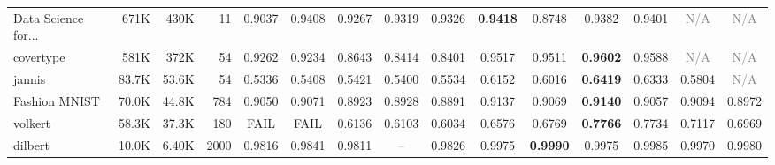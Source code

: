 \begin{table}[t]
{\begin{tabular}{lrrrccccccccccc}
Data Science for... & 671K & 430K & 11 & \cellcolor[HTML]{FDEDCC}0.9037 & \cellcolor[HTML]{DAEAD3}0.9408 & \cellcolor[HTML]{EAEED0}0.9267 & \cellcolor[HTML]{E4ECD1}0.9319 & \cellcolor[HTML]{E3ECD1}0.9326 & \cellcolor[HTML]{D9EAD3}\textbf{0.9418} & \cellcolor[HTML]{F4CCCC}0.8748 & \cellcolor[HTML]{DDEBD2}0.9382 & \cellcolor[HTML]{DBEAD3}0.9401 & \textcolor{gray}{N/A} & \textcolor{gray}{N/A} \\
covertype & 581K & 372K & 54 & \cellcolor[HTML]{EFEFCF}0.9262 & \cellcolor[HTML]{F0EFCF}0.9234 & \cellcolor[HTML]{F8DBCC}0.8643 & \cellcolor[HTML]{F4CDCC}0.8414 & \cellcolor[HTML]{F4CCCC}0.8401 & \cellcolor[HTML]{DEEBD2}0.9517 & \cellcolor[HTML]{DFEBD2}0.9511 & \cellcolor[HTML]{D9EAD3}\textbf{0.9602} & \cellcolor[HTML]{DAEAD3}0.9588 & \textcolor{gray}{N/A} & \textcolor{gray}{N/A} \\
jannis & 83.7K & 53.6K & 54 & \cellcolor[HTML]{F4CCCC}0.5336 & \cellcolor[HTML]{F5D1CC}0.5408 & \cellcolor[HTML]{F6D2CC}0.5421 & \cellcolor[HTML]{F5D0CC}0.5400 & \cellcolor[HTML]{F8DACC}0.5534 & \cellcolor[HTML]{ECEED0}0.6152 & \cellcolor[HTML]{F5F0CE}0.6016 & \cellcolor[HTML]{D9EAD3}\textbf{0.6419} & \cellcolor[HTML]{DFEBD2}0.6333 & \cellcolor[HTML]{FEEDCC}0.5804 & \textcolor{gray}{N/A} \\
Fashion MNIST & 70.0K & 44.8K & 784 & \cellcolor[HTML]{F4F0CE}0.9050 & \cellcolor[HTML]{EEEECF}0.9071 & \cellcolor[HTML]{F7D6CC}0.8923 & \cellcolor[HTML]{F7D7CC}0.8928 & \cellcolor[HTML]{F4CCCC}0.8891 & \cellcolor[HTML]{DAEAD3}0.9137 & \cellcolor[HTML]{EFEFCF}0.9069 & \cellcolor[HTML]{D9EAD3}\textbf{0.9140} & \cellcolor[HTML]{F2EFCE}0.9057 & \cellcolor[HTML]{E7EDD0}0.9094 & \cellcolor[HTML]{FBE5CC}0.8972 \\
volkert & 58.3K & 37.3K & 180 & \textcolor{red!70!black}{FAIL} & \textcolor{red!70!black}{FAIL} & \cellcolor[HTML]{F5D0CC}0.6136 & \cellcolor[HTML]{F5CFCC}0.6103 & \cellcolor[HTML]{F4CCCC}0.6034 & \cellcolor[HTML]{FBE4CC}0.6576 & \cellcolor[HTML]{FDECCC}0.6769 & \cellcolor[HTML]{D9EAD3}\textbf{0.7766} & \cellcolor[HTML]{DAEAD3}0.7734 & \cellcolor[HTML]{F5F0CE}0.7117 & \cellcolor[HTML]{FCF1CD}0.6969 \\
dilbert & 10.0K & 6.40K & 2000 & \cellcolor[HTML]{F5CECC}0.9816 & \cellcolor[HTML]{F8D9CC}0.9841 & \cellcolor[HTML]{F4CCCC}0.9811 & \textcolor{gray}{--} & \cellcolor[HTML]{F6D2CC}0.9826 & \cellcolor[HTML]{DFEBD2}0.9975 & \cellcolor[HTML]{D9EAD3}\textbf{0.9990} & \cellcolor[HTML]{DFEBD2}0.9975 & \cellcolor[HTML]{DBEAD3}0.9985 & \cellcolor[HTML]{E1ECD1}0.9970 & \cellcolor[HTML]{DDEBD2}0.9980 \\

\end{tabular}}
\end{table}
